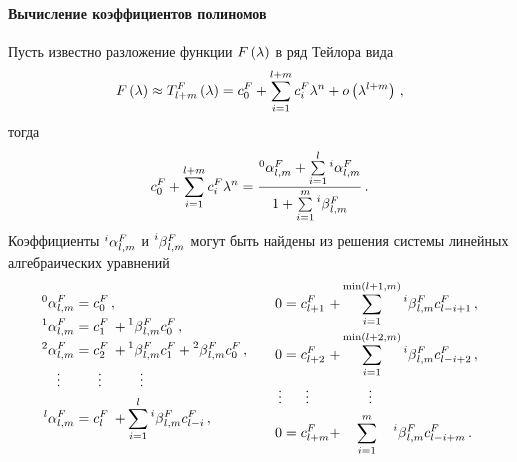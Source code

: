 \documentclass[../document.tex]{subfiles}
\begin{document}
                \paragraph{Вычисление коэффициентов полиномов}
                    Пусть известно разложение функции $F\left(\lambda\right)$ в ряд Тейлора вида
                    \begin{equation}
                        F\left(\lambda\right)\approx T_{l+m}^F\left(\lambda\right)=c_0^F+\sum\limits_{i=1}^{l+m}c_i^F\lambda^n+o\left(\lambda^{l+m}\right)\,,
                    \end{equation}
                    тогда
                    \begin{equation}
                        c_0^F+\sum\limits_{i=1}^{l+m}c_i^F\lambda^n=\frac{\prescript{0}{}{\alpha}_{l,m}^F+\sum\limits_{i=1}^l\prescript{i}{}{\alpha}_{l,m}^F}{1+\sum\limits_{i=1}^m\prescript{i}{}{\beta}_{l,m}^F}\,.
                    \end{equation}
                    Коэффициенты $\prescript{i}{}{\alpha}_{l,m}^F$ и $\prescript{i}{}{\beta}_{l,m}^F$ могут быть найдены из решения системы линейных алгебраических уравнений
                    \begin{equation}
                        \begin{alignedat}{4}
                            \prescript{0}{}{\alpha}_{l,m}^F&=c_0^F\,,&&\\
                            \prescript{1}{}{\alpha}_{l,m}^F&=c_1^F&+&\prescript{1}{}{\beta}_{l,m}^Fc_0^F\,,\\
                            \prescript{2}{}{\alpha}_{l,m}^F&=c_2^F&+&\prescript{1}{}{\beta}_{l,m}^Fc_1^F+\prescript{2}{}{\beta}_{l,m}^Fc_0^F\,,\\
                            \vdots\quad&\quad\ \ \vdots&&\quad\vdots\\
                            \prescript{l}{}{\alpha}_{l,m}^F&=c_l^F&+&\sum\limits_{i=1}^l\prescript{i}{}{\beta}_{l,m}^Fc_{l-i}^F\,,\\
                        \end{alignedat}\qquad
                        \begin{alignedat}{4}
                            0&=c_{l+1}^F&+&\sum\limits_{i=1}^{\min\pa{l+1,m}}\prescript{i}{}{\beta}_{l,m}^Fc_{l-i+1}^F\,,\\
                            0&=c_{l+2}^F&+&\sum\limits_{i=1}^{\min\pa{l+2,m}}\prescript{i}{}{\beta}_{l,m}^Fc_{l-i+2}^F\,,\\
                            \vdots&\quad\ \ \vdots&&\qquad\vdots\\
                            0&=c_{l+m}^F&+&\quad\sum\limits_{i=1}^{m}\quad\prescript{i}{}{\beta}_{l,m}^Fc_{l-i+m}^F\,.
                        \end{alignedat}
                    \end{equation}
\end{document}

